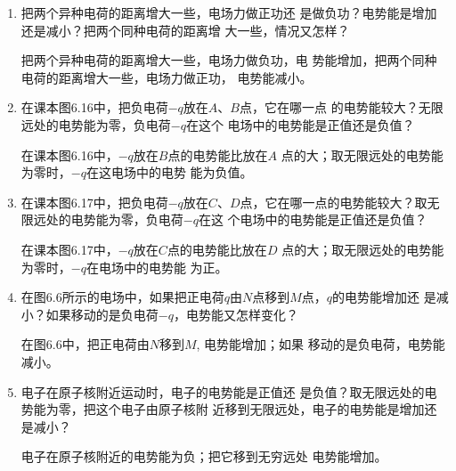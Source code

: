 \begin{enumerate}
	\item 把两个异种电荷的距离增大一些，电场力做正功还
是做负功？电势能是增加还是减小？把两个同种电荷的距离增
大一些，情况又怎样？

\begin{solution}
    把两个异种电荷的距离增大一些，电场力做负功，电
    势能增加，把两个同种电荷的距离增大一些，电场力做正功，
    电势能减小。
\end{solution}

\item 在课本图6.16中，把负电荷$-q$放在$A$、$B$点，它在哪一点
的电势能较大？无限远处的电势能为零，负电荷$-q$在这个
电场中的电势能是正值还是负值？

\begin{solution}
    在课本图6.16中，$-q$放在$B$点的电势能比放在$A$
    点的大；取无限远处的电势能为零时，$-q$在这电场中的电势
    能为负值。
\end{solution}

\item 在课本图6.17中，把负电荷$-q$放在$C$、$D$点，它在哪一点的电势能较大？取无限远处的电势能为零，负电荷$-q$在这
个电场中的电势能是正值还是负值？

\begin{solution}
    在课本图6.17中，$-q$放在$C$点的电势能比放在$D$
    点的大；取无限远处的电势能为零时，$-q$在电场中的电势能
    为正。
\end{solution}

\item 在图6.6所示的电场中，如果把正电荷$q$由$N$点移到$M$点，$q$的电势能增加还
是减小？如果移动的是负电荷$-q$，电势能又怎样变化？
\begin{figure}[htp]\centering

    \caption{}
\end{figure}	


\begin{solution}
    在图6.6中，把正电荷由$N$移到$M$, 电势能增加；如果
    移动的是负电荷，电势能减小。
\end{solution}

\item  电子在原子核附近运动时，电子的电势能是正值还
是负值？取无限远处的电势能为零，把这个电子由原子核附
近移到无限远处，电子的电势能是增加还是减小？

\begin{solution}
    电子在原子核附近的电势能为负；把它移到无穷远处
    电势能增加。
\end{solution}

\end{enumerate}



